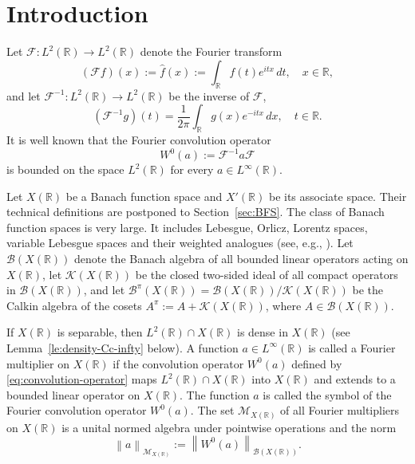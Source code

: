 \documentclass{birkjour}
\numberwithin{equation}{section}
\newcommand{\R}{\mathbb{R}}
\newcommand{\cB}{\mathcal{B}}
\newcommand{\cF}{\mathcal{F}}
\newcommand{\cK}{\mathcal{K}}
\newcommand{\cM}{\mathcal{M}}
\begin{document}
\maketitle
\section{Introduction}
Let $\cF:L^2(\R)\to L^2(\R)$ denote the Fourier transform
\[
(\cF f)(x):=\widehat{f}(x):=\int_\R f(t)e^{itx}\,dt,
\quad
x\in\R,
\]
and let $\cF^{-1}:L^2(\R)\to L^2(\R)$ be the inverse of $\cF$,
\[
(\cF^{-1}g)(t)=\frac{1}{2\pi}\int_\R g(x)e^{-itx}\,d x,
\quad
t\in\R.
\]
It is well known that the Fourier convolution operator
\begin{equation}\label{eq:convolution-operator}
W^0(a):=\cF^{-1}a\cF
\end{equation}
is bounded on the space $L^2(\R)$ for every $a\in L^\infty(\R)$.

Let $X(\R)$ be a Banach function space and $X'(\R)$ be its associate
space. Their technical definitions are postponed to
Section~\ref{sec:BFS}. The class of Banach function spaces is
very large. It includes Lebesgue, Orlicz, Lorentz spaces, variable
Lebesgue spaces and their weighted analogues (see, e.g., \cite{BS88,CF13}).
Let $\cB(X(\R))$ denote the Banach algebra of all bounded linear operators
acting on $X(\R)$, let $\cK(X(\R))$ be the closed two-sided ideal
of all compact operators in $\cB(X(\R))$, and let
$\cB^\pi(X(\R))=\cB(X(\R))/\cK(X(\R))$ be the Calkin algebra of the
cosets $A^\pi:=A+\cK(X(\R))$, where $A\in\cB(X(\R))$.

If $X(\R)$ is separable, then $L^2(\R)\cap X(\R)$
is dense in $X(\R)$ (see Lemma~\ref{le:density-Cc-infty} below). A function
$a\in L^\infty(\R)$ is called a Fourier multiplier on $X(\R)$ if the
convolution operator $W^0(a)$ defined by \eqref{eq:convolution-operator}
maps $L^2(\R)\cap X(\R)$ into $X(\R)$ and extends to a bounded linear
operator on $X(\R)$. The function $a$ is called the symbol of the Fourier
convolution operator $W^0(a)$. The set $\cM_{X(\R)}$ of all Fourier
multipliers on  $X(\R)$ is a unital normed algebra under pointwise
operations and the norm
\[
\left\|a\right\|_{\cM_{X(\R)}}:=\left\|W^0(a)\right\|_{\cB(X(\R))}.
\]
\end{document}
